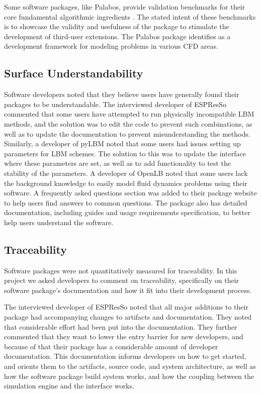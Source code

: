 \documentclass[12pt, notitlepage]{article}
\begin{document}
Some software packages, like Palabos, provide validation benchmarks for their core fundamental algorithmic ingredients \citep{latt2021palabos}. The stated intent of these benchmarks is to showcase the validity and usefulness of the package to stimulate the development of third-user extensions. The Palabos package identifies as a development framework for modeling problems in various CFD areas. 

\subsection{Surface Understandability}

Software developers noted that they believe users have generally found their packages to be understandable. The interviewed developer of ESPResSo commented that some users have attempted to run physically incompatible LBM methods, and the solution was to edit the code to prevent such combinations, as well as to update the documentation to prevent misunderstanding the methods. Similarly, a developer of pyLBM noted that some users had issues setting up parameters for LBM schemes. The solution to this was to update the interface where these parameters are set, as well as to add functionality to test the stability of the parameters. A developer of OpenLB noted that some users lack the background knowledge to easily model fluid dynamics problems using their software. A frequently asked questions section was added to their package website to help users find answers to common questions. The package also has detailed documentation, including guides and usage requirements specification, to better help users understand the software.

\subsection{Traceability}

Software packages were not quantitatively measured for traceability.
In this project we asked developers to comment on traceability, specifically on their software package's documentation and how it fit into their development process. 

The interviewed developer of ESPResSo noted that all major additions to their package had accompanying changes to artifacts and documentation. They noted that considerable effort had been put into the documentation. They further commented that they want to lower the entry barrier for new developers, and because of that their package has a considerable amount of developer documentation. This documentation informs developers on how to get started, and orients them to the artifacts, source code, and system architecture, as well as how the software package build system works, and how the coupling between the simulation engine and the interface works. 
\end{document}
